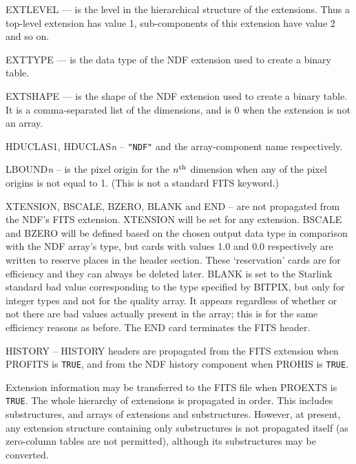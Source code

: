 {{{{            \sstitem
            EXTLEVEL --- is the level in the hierarchical structure of the
              extensions.  Thus a top-level extension has value 1,
              sub-components of this extension have value 2 and so on.

            \sstitem
            EXTTYPE --- is the data type of the NDF extension used to
              create a binary table.

            \sstitem
            EXTSHAPE --- is the shape of the NDF extension used to
            create a binary table.  It is a comma-separated list of the
            dimensions, and is 0 when the extension is not an array.

            \sstitem
            HDUCLAS1, HDUCLAS{\em{n}} -- {\tt "NDF"} and the
              array-component name respectively.

            \sstitem
            LBOUND{\em{n}} -- is the pixel origin for the $n^{\rm th}$ dimension
              when any of the pixel origins is not equal to 1.  (This is not a
              standard FITS keyword.)

            \sstitem
            XTENSION, BSCALE, BZERO, BLANK and END -- are not propagated
              from the NDF's FITS extension.  XTENSION will be set for
              any extension.  BSCALE and BZERO will be defined based on
              the chosen output data type in comparison with the NDF
              array's type, but cards with values 1.0 and 0.0 respectively
              are written to reserve places in the header section.  These
              `reservation' cards are for efficiency and they can always
              be deleted later.  BLANK is set to the Starlink standard bad
              value corresponding to the type specified by BITPIX, but only
              for integer types and not for the quality array.  It appears
              regardless of whether or not there are bad values actually
              present in the array; this is for the same efficiency reasons
              as before.  The END card terminates the FITS header.

           \sstitem
              HISTORY -- HISTORY headers are propagated from the FITS
              extension when PROFITS is {\tt TRUE}, and from the NDF
              history component when PROHIS is {\tt TRUE}.

         }

         \sstitem
         Extension information may be transferred to the FITS file when
         PROEXTS is {\tt TRUE}.  The whole hierarchy of extensions is propagated
         in order.  This includes substructures, and arrays of extensions
         and substructures.  However, at present, any extension structure
         containing only substructures is not propagated itself (as
         zero-column tables are not permitted), although its
         substructures may be converted.
 
}}}
